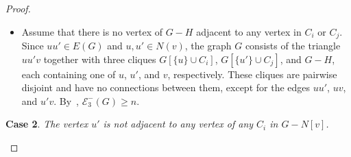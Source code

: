 \documentclass[a4paper,12pt]{article}
\theoremstyle{plain}
\newenvironment{proof*}{\noindent \emph{Proof of the claim.}}{\hfill$\Diamond$}
\begin{document}
\begin{proof}
\begin{proof*}
\begin{itemize}
\begin{figure}[ht]
\begin{subfigure}[t]{.45\textwidth}
\caption{$G[\{v,u,u',a, a',b\}]\cong H_{5}$}
\label{fig:H5inCase1}
\end{subfigure}
\caption{Configurations in Case 1 of }
\label{fig:H4H5inCase1inClaim3.9}
\end{figure}
By~, we have that $\mathcal{E}_3^{-}(H')\geq 6=|H'|+1$ and $\mathcal{E}_3^{-}(H'')\geq 8=|H''|+2$. Note that $G-H'$ is connected if $|C_i|=1$, and $G-H''$ has at most two connected components if $|C_i|\geq 2$. By~, either $\mathcal{E}_3^{-}(G)\geq\mathcal{E}_3^{-}(H')+\mathcal{E}_3^{-}(G-H')\geq 6+\big( (n-5)-1\big)=n$, or $\mathcal{E}_3^{-}(G)\geq\mathcal{E}_3^{-}(H'')+\mathcal{E}_3^{-}(G-H'')\geq 8+\big( (n-6)-2\big)=n$, each leading to a contradiction.   
    
    \item Assume that there is no vertex of $G-H$ adjacent to any vertex in $C_i$ or $C_j$. Since $uu' \in E(G)$ and $u,u' \in N(v)$, the graph $G$ consists of the triangle $uu'v$ together with three cliques $G[\{u\}\cup C_i]$, $G[\{u'\}\cup C_j]$, and $G-H$, each containing one of $u$, $u'$, and $v$, respectively. These cliques are pairwise disjoint and have no connections between them, except for the edges $uu'$, $uv$, and $u'v$. By~, $\mathcal{E}_3^{-}(G)\geq n$.
\end{itemize}

\smallskip
\noindent
{\bf Case 2}. \emph{The vertex $u'$ is not adjacent to any vertex of any $C_i$ in $G-N[v]$.}



\smallskip


\end{proof*}
\end{proof}
\end{document}
